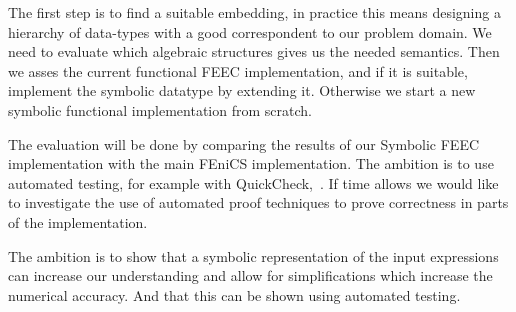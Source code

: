 \documentclass{scrartcl}
\begin{document}
The first step is to find a suitable embedding, in practice this means
designing a hierarchy of data-types with a good correspondent to our problem
domain.  We need to evaluate which algebraic structures gives us the needed
semantics. Then we asses the current functional FEEC implementation, and if
it is suitable, implement the symbolic datatype by extending it. Otherwise we
start a new symbolic functional implementation from scratch.

The evaluation will be done by comparing the results of our Symbolic FEEC
implementation with the main FEniCS implementation.
The ambition is to use automated testing, for example with
QuickCheck,~\cite{claessen_quickcheck_2000}.
If time allows we would like to investigate the use of automated proof
techniques to prove correctness in parts of the implementation.



The ambition is to show that a symbolic representation of the input expressions
can increase our understanding and allow for simplifications which increase the
numerical accuracy. And that this can be shown using automated testing.








\end{document}
